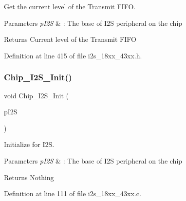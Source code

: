 Get the current level of the Transmit F\+I\+FO. 


\begin{DoxyParams}{Parameters}
{\em p\+I2S} & \+: The base of I2S peripheral on the chip \\
\hline
\end{DoxyParams}
\begin{DoxyReturn}{Returns}
Current level of the Transmit F\+I\+FO 
\end{DoxyReturn}


Definition at line 415 of file i2s\+\_\+18xx\+\_\+43xx.\+h.

\mbox{\label{group___i2_s__18_x_x__43_x_x_ga006752f0240a956ae02fba521e63c053}} 
\subsubsection{\texorpdfstring{Chip\+\_\+\+I2\+S\+\_\+\+Init()}{Chip\_I2S\_Init()}}
{\footnotesize\ttfamily void Chip\+\_\+\+I2\+S\+\_\+\+Init (\begin{DoxyParamCaption}\item[{\hyperlink{struct_l_p_c___i2_s___t}{L\+P\+C\+\_\+\+I2\+S\+\_\+T} $\ast$}]{p\+I2S }\end{DoxyParamCaption})}



Initialize for I2S. 


\begin{DoxyParams}{Parameters}
{\em p\+I2S} & \+: The base of I2S peripheral on the chip \\
\hline
\end{DoxyParams}
\begin{DoxyReturn}{Returns}
Nothing 
\end{DoxyReturn}


Definition at line 111 of file i2s\+\_\+18xx\+\_\+43xx.\+c.

\mbox{\label{group___i2_s__18_x_x__43_x_x_ga36b0f5c62d5c703c1374bdcc0d84d07f}} 
